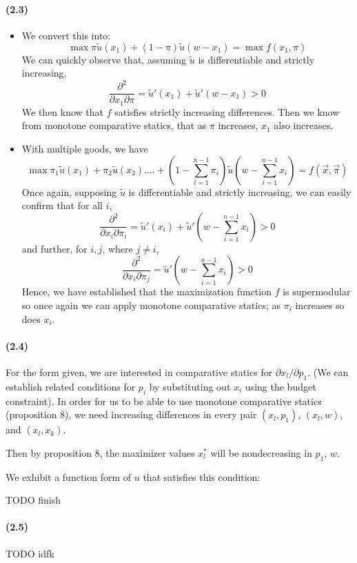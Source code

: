 \documentclass[10pt,letter]{article}
\begin{document}
\paragraph{(2.3)}
\begin{itemize}
\item We convert this into:
\[ \max \pi \tilde{u}(x_1) + (1-\pi) \tilde{u}(w - x_1) = \max f(x_1, \pi) \]
We can quickly observe that, assuming $\tilde{u}$ is differentiable and strictly increasing,
\[ \frac{\partial^2 }{\partial x_1 \partial \pi} = \tilde{u}'(x_1) + \tilde{u}'(w-x_1) > 0 \]
We then know that $f$ satisfies strictly increasing differences. Then we know from monotone comparative statics, that as $\pi$ increases, $x_1$ also increases.
\item With multiple goods, we have
\[ \max \pi_1 \tilde{u}(x_1) + \pi_2 \tilde{u}(x_2) .... + (1 - \sum_{i=1}^{n-1} \pi_i )\tilde{u} \left(w - \sum_{i=1}^{n-1} x_i \right) = f(\vec{x}, \vec{\pi}) \]
Once again, supposing $\tilde{u}$ is differentiable and strictly increasing, we can easily confirm that for all $i$,
\[ \frac{\partial^2 }{\partial x_i \partial \pi_i} = \tilde{u}'(x_i) + \tilde{u}'\left(w - \sum_{i=1}^{n-1} x_i \right) > 0  \]
and further, for $i, j$, where $j \neq i$,
\[ \frac{\partial^2 }{\partial x_i \partial \pi_j} = \tilde{u}'\left(w - \sum_{i=1}^{n-1} x_i \right) > 0 \]
Hence, we have established that the maximization function $f$ is supermodular so once again we can apply monotone comparative statics; as $\pi_i$ increases so does $x_i$.
\end{itemize}
\paragraph{(2.4)}
For the form given, we are interested in comparative statics for $\partial x_l / \partial p_1$. (We can establish related conditions for $p_i$ by substituting out $x_i$ using the budget constraint). In order for us to be able to use monotone comparative statics (proposition 8), we need increasing differences in every pair $(x_l, p_1)$, $(x_l, w)$, and $(x_l, x_k)$.

Then by proposition 8, the maximizer values $x_l^*$ will be nondecreasing in $p_1$, $w$.

We exhibit a function form of $u$ that satisfies this condition:

TODO finish

\paragraph{(2.5)}

TODO idfk 
\end{document}
